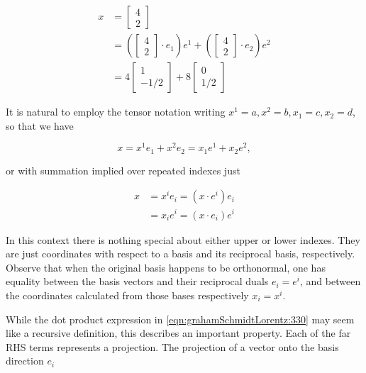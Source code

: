 \begin{equation}\label{eqn:grahamSchmidtLorentz:290}
\begin{aligned}
x
&=
\begin{bmatrix}
4 \\
2
\end{bmatrix} \\
&=
\left(
\begin{bmatrix}
4 \\
2
\end{bmatrix}
\cdot e_1
\right)
e^1
+
\left(
\begin{bmatrix}
4 \\
2
\end{bmatrix}
\cdot e_2
\right)
e^2 \\
&= 4
\begin{bmatrix}
1 \\
-1/2
\end{bmatrix}
+
8
\begin{bmatrix}
0 \\
1/2
\end{bmatrix}
\end{aligned}
\end{equation}

It is natural to employ the tensor notation writing $x^1 = a, x^2 = b, x_1 = c, x_2 = d$, so that we have

\begin{equation}\label{eqn:grahamSchmidtLorentz:310}
x = x^1 e_1 + x^2 e_2 = x_1 e^1 + x_2 e^2,
\end{equation}

or with summation implied over repeated indexes just

\begin{equation}\label{eqn:grahamSchmidtLorentz:330}
\begin{aligned}
x &= x^i e_i = (x \cdot e^i) e_i \\
  &= x_i e^i = (x \cdot e_i) e^i
\end{aligned}
\end{equation}

In this context there is nothing special about either upper or lower indexes.  They are just coordinates with respect to a basis and its reciprocal basis, respectively.  Observe that when the original basis happens to be orthonormal, one has equality between the basis vectors and their reciprocal duals $e_i = e^i$, and between the coordinates calculated from those bases respectively $x_i = x^i$.

While the dot product expression in \ref{eqn:grahamSchmidtLorentz:330} may seem like a recursive definition, this describes an important property.  Each of the far RHS terms represents a projection.  The projection of a vector onto the basis direction $e_i$

